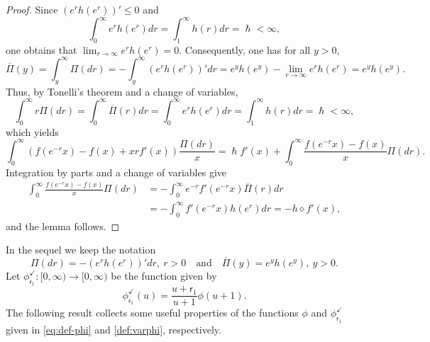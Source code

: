 \documentclass[JEP,XML,SOM,Unicode]{cedram}
\theoremstyle{plain}
\theoremstyle{definition}
\newcommand{\vat}{{\mathsf{r}_1}}
\renewcommand{\varphi}{{\phi_{\vat}^{\checkmark}}}
\let\h\hslash
\begin{document}
\begin{proof}
Since $(e^rh(e^r))' \le 0$ and
\begin{equation*}
\int_0^\infty e^rh(e^r)dr = \int_1^\infty h(r)dr = \h < \infty,
\end{equation*}
one obtains that $\lim_{r \to \infty} e^r h(e^r) = 0$. Consequently, one has for all $y>0$,
\begin{equation*}
\overline{\Pi}(y) = \int_y^\infty \Pi(dr) = -\int_y^\infty (e^rh(e^r))' dr = e^yh(e^y) - \lim_{r \to \infty} e^r h(e^r) = e^yh(e^y).
\end{equation*}
Thus, by Tonelli's theorem and a change of variables,
\begin{equation*}
\int_0^\infty r\Pi(dr) = \int_0^\infty \overline{\Pi}(r)dr = \int_0^{\infty} e^r h(e^r) dr = \int_1^\infty h(r)dr = \h < \infty,
\end{equation*}
which yields
\begin{equation*}
\int_{0}^{\infty} \left(f(e^{-r}x)-f(x)+xrf'(x)\right)\frac{\Pi(dr)}{x} = \h f'(x) + \int_0^\infty \frac{f(e^{-r}x)-f(x)}{x} \Pi(dr).
\end{equation*}
Integration by parts and a change of variables give
\begin{align*}
\int_0^\infty \frac{f(e^{-r}x)-f(x)}{x} \Pi(dr) &= -\int_0^\infty e^{-r} f'(e^{-r}x) \overline{\Pi}(r)dr\\
&= -\int_0^\infty f'(e^{-r}x)h(e^r)dr = -h \diamond f'(x),
\end{align*}
and the lemma follows.
\end{proof}

In the sequel we keep the notation
\[
\Pi(dr) = -(e^rh(e^r))'dr,\ r > 0\quad\text{and}\quad \overline{\Pi}(y) = e^y h(e^y),\ y > 0.
\]
Let $\varphi: [0,\infty) \to [0,\infty)$ be the function given by
\begin{equation}
\label{def:varphi}
\varphi(u) = \frac{u+\vat}{u+1}\phi(u+1).
\end{equation}
The following result collects some useful properties of the functions $\phi$ and $\varphi$
given in \eqref{eq:def-phi} and \eqref{def:varphi}, respectively.
\end{document}
